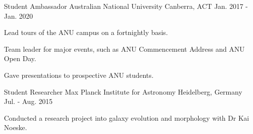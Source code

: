 \begin{cventries}
  \cventry
    {Student Ambassador} %
    {Australian National University} %
    {Canberra, ACT} %
    {Jan. 2017 -  Jan. 2020} %
    {
      \begin{cvitems} %
        \item {Lead tours of the ANU campus on a fortnightly basis.}
        \item {Team leader for major events, such as ANU Commencement Address and ANU Open Day.}
        \item {Gave presentations to prospective ANU students.}
      \end{cvitems}
    }
    
  \cventry
    {Student Researcher} %
    {Max Planck Institute for Astronomy} %
    {Heidelberg, Germany} %
    {Jul. - Aug. 2015} %
    {
      \begin{cvitems} %
        \item {Conducted a research project into galaxy evolution and morphology with Dr Kai Noeske.}
      \end{cvitems}
    }
    

\end{cventries}
